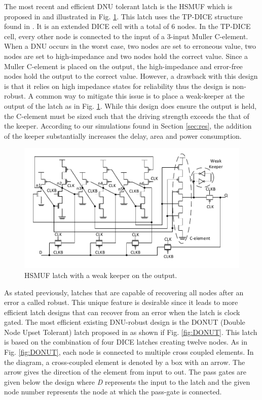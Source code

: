 The most recent and efficient DNU tolerant latch is the HSMUF which is proposed in \cite{HSMUF} and illustrated in Fig. \ref{HSMUF_fig}. This latch uses the TP-DICE structure found in \cite{TPDICE}. It is an extended DICE cell with a total of 6 nodes. In the TP-DICE cell, every other node is connected to the input of a 3-input Muller C-element. When a DNU occurs in the worst case, two nodes are set to erroneous value, two nodes are set to high-impedance and two nodes hold the correct value. Since a Muller C-element is placed on the output, the high-impedance and error-free nodes hold the output to the correct value. However, a drawback with this design is that it relies on high impedance states for reliability thus the design is non-robust. A common way to mitigate this issue is to place a weak-keeper at the output of the latch as in Fig. \ref{HSMUF_fig}. While this design does ensure the output is held, the C-element must be sized such that the driving strength exceeds the that of the keeper. According to our simulations found in Section \ref{sec:res}, the addition of the keeper substantially increases the delay, area and power consumption. 

\begin{figure}[!htbp]
\centering
\includegraphics[width=\linewidth]{Figures/HSMUF}
\caption{HSMUF latch \cite{HSMUF} with a weak keeper on the output.}
\label{HSMUF_fig}
\end{figure}
 
As stated previously, latches that are capable of recovering all nodes after an error a called robust. This unique feature is desirable since it leads to more efficient latch designs that can recover from an error when the latch is clock gated. The most efficient existing DNU-robust design is the DONUT (Double Node Upset Tolerant) latch proposed in \cite{DONUT} as shown if Fig. \ref{fig:DONUT}. This latch is based on the combination of four DICE latches creating twelve nodes. As in Fig. \ref{fig:DONUT}, each node is connected to multiple cross coupled elements. In the diagram, a cross-coupled element is denoted by a box with an arrow. The arrow gives the direction of the element from input to out. The pass gates are given below the design where \textit{D} represents the input to the latch and the given node number represents the node at which the pass-gate is connected.

